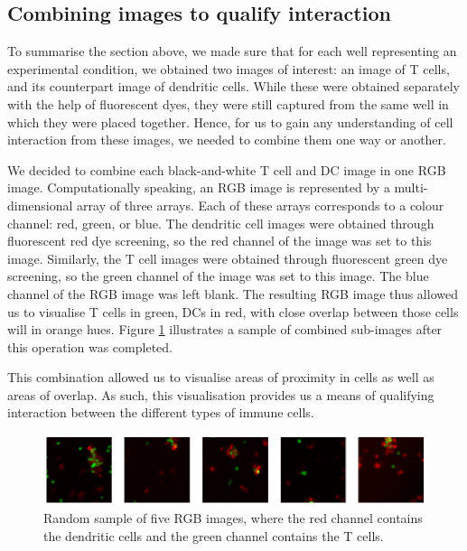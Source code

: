 \subsection{Combining images to qualify interaction} \label{subsec:combining}

To summarise the section above, we made sure that for each well representing an experimental condition, we obtained two images of interest: an image of T cells, and its counterpart image of dendritic cells. While these were obtained separately with the help of fluorescent dyes, they were still captured from the same well in which they were placed together. Hence, for us to gain any understanding of cell interaction from these images, we needed to combine them one way or another. 

We decided to combine each black-and-white T cell and DC image in one RGB image. Computationally speaking, an RGB image is represented by a multi-dimensional array of three arrays. Each of these arrays corresponds to a colour channel: red, green, or blue. The dendritic cell images were obtained through fluorescent red dye screening, so the red channel of the image was set to this image. Similarly, the T cell images were obtained through fluorescent green dye screening, so the green channel of the image was set to this image. The blue channel of the RGB image was left blank. The resulting RGB image thus allowed us to visualise T cells in green, DCs in red, with close overlap between those cells will in orange hues. Figure \ref{fig:combined} illustrates a sample of combined sub-images after this operation was completed.

This combination allowed us to visualise areas of proximity in cells as well as areas of overlap. As such, this visualisation provides us a means of qualifying interaction between the different types of immune cells. 

\begin{figure}[h]
    \centering
    \includegraphics[width=\textwidth]{dissertation/figures/combined_cells.png}
    \caption{Random sample of five RGB images, where the red channel contains the dendritic cells and the green channel contains the T cells.}
    \label{fig:combined}
\end{figure}

